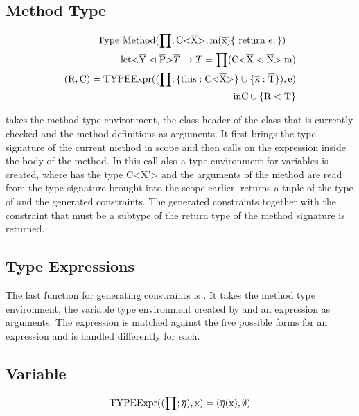 \subsection{Method Type}

\begin{align*}
    \text{Type Method}(\prod, \text{C<} \overline{\text{X}} \text{>}, \text{m} ( \overline{\text{x}} ) \{ \ \text{return e}; \} ) = \\
    \text{let} \text{<} \overline{\text{Y}} \vartriangleleft \overline{\text{P}} \text{>} \overline{T} \to T = \prod ( \text{C} \text{<} \overline{\text{X}} \vartriangleleft \overline{\text{N}} \text{>} \text{.m} ) \\
    ( \text{R}, \text{C} ) = \text{TYPEExpr} (( \prod; \{ \text{this} : \text{C<} \overline{\text{X}} \text{>} \} \cup \{ \overline{\text{x}} : \overline{\text{T}} \} ) , \text{e} ) \\
    \text{in} \text{C} \cup \{ \text{R} < \text{T} \}\\
\end{align*}

 takes the method type environment, the class header  of the class that is currently checked and the method definitions as arguments.
It first brings the type signature of the current method in scope and then calls  on the expression  inside the body of the method. In this call also a type environment for variables is created, where  has the type C<X'> and the arguments of the method are read from the type signature brought into the scope earlier.
 returns a tuple of the type  of  and the generated constraints. The generated constraints together with the constraint that  must be a subtype of the return type of the method signature is returned.

\subsection{Type Expressions}
The last function for generating constraints is . It takes the method type environment, the variable type environment created by  and an expression  as arguments.
The expression  is matched against the five possible forms for an expression and is handled differently for each.

\subsection{Variable}

\begin{align*}
    \text{TYPEExpr}((\prod; \overline{\eta}), \text{x}) = (\overline{\eta} (\text{x}), \emptyset)\\
\end{align*}

